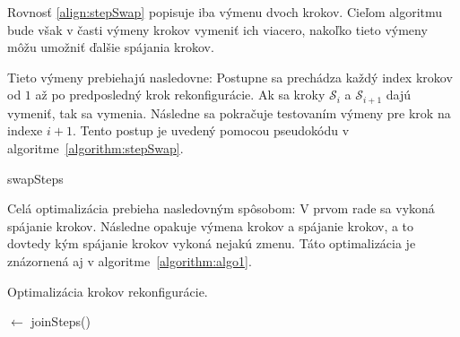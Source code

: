 \documentclass[
  digital, %
  oneside, %
  table,   %
  lof,     %
  nolot,     %
]{fithesis3}
\begin{document}
Rovnosť \ref{align:stepSwap} popisuje iba výmenu dvoch krokov. Cieľom algoritmu bude však v časti výmeny krokov vymeniť ich viacero, nakoľko tieto výmeny môžu umožniť ďalšie spájania krokov. 

Tieto výmeny prebiehajú nasledovne: Postupne sa prechádza každý index krokov od $1$ až po predposledný krok rekonfigurácie. Ak sa kroky $\mathcal{S}_i$ a $\mathcal{S}_{i + 1}$ dajú vymeniť, tak sa vymenia. Následne sa pokračuje testovaním výmeny pre krok na indexe $i + 1$. Tento postup je uvedený pomocou pseudokódu v algoritme~\ref{algorithm:stepSwap}. 

\begin{algorithm}
    \caption{swapSteps}
    \label{algorithm:stepSwap}
    
    \DontPrintSemicolon
    
\end{algorithm}

Celá optimalizácia prebieha nasledovným spôsobom: V prvom rade sa vykoná spájanie krokov. Následne opakuje výmena krokov a spájanie krokov, a to dovtedy kým spájanie krokov vykoná nejakú zmenu. Táto optimalizácia je znázornená aj v algoritme~\ref{algorithm:algo1}. 

\begin{algorithm}
    \caption{Optimalizácia krokov rekonfigurácie. }
    \label{algorithm:algo1}
    
    \DontPrintSemicolon
    
    \Steps $\leftarrow$ joinSteps(\Steps)\;
\end{algorithm}
\end{document}
